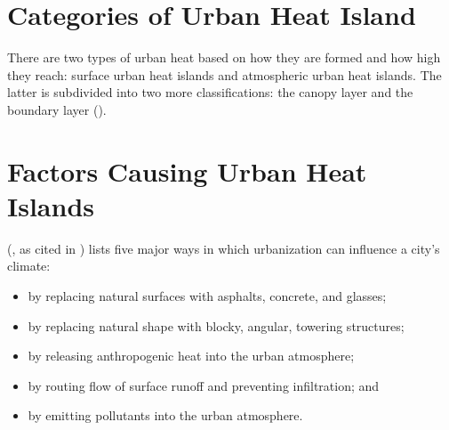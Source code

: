 \section{Categories of Urban Heat Island}

There are two types of urban heat based on how they are formed and how high they reach:
surface urban heat islands and atmospheric urban heat islands.
The latter is subdivided into two more classifications:
the canopy layer and the boundary layer (\cite{Zhou2018}).

\section{Factors Causing Urban Heat Islands}

\citeauthor{Bridgman1995} (\citeyear{Bridgman1995}, as cited in \cite{Khan2021}) lists five major ways in which urbanization can influence a city's climate:
\begin{itemize}
	\item by replacing natural surfaces with asphalts, concrete, and glasses;
	\item by replacing natural shape with blocky, angular, towering structures;
	\item by releasing anthropogenic heat into the urban atmosphere;
	\item by routing flow of surface runoff and preventing infiltration; and
	\item by emitting pollutants into the urban atmosphere.
\end{itemize}